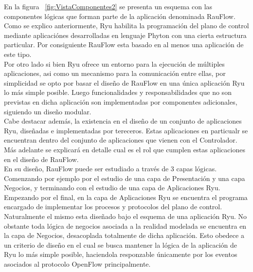 En la figura ~\ref{fig:VistaComponentes2} se presenta un esquema con las componentes l\'ogicas que forman parte de la aplicaci\'on denominada RauFlow. Como se explico anteriormente, Ryu habilita la programaci\'on del plano de control mediante aplicaci\'ones desarrolladas en lenguaje Phyton con una cierta estructura particular. Por consiguiente RauFlow esta basado en al menos una aplicaci\'on de este tipo.\\

Por otro lado si bien Ryu ofrece un entorno para la ejecuci\'on de m\'ultiples aplicaciones, asi como un mecanismo para la comunicaci\'on entre ellas, por simplicidad se opto por basar el dise\~no de RauFlow en una \'unica aplicaci\'on Ryu lo m\'as simple posible. Luego funcionalidades y responsabilidades que no son previstas en dicha aplicaci\'on son implementadas por componentes adicionales, siguiendo un dise\~no modular.\\

Cabe destacar adem\'as, la existencia en el dise\~no de un conjunto de aplicaciones Ryu, dise\~nadas e implementadas por tereceros. Estas aplicaciones en particualr se encuentran dentro del conjunto de aplicaciones que vienen con el Controlador. M\'as adelante se explicar\'a en detalle cual es el rol que cumplen estas aplicaciones en el dise\~no de RauFlow.\\

En su dise\~no, RauFlow puede ser estudiado a trav\'es de 3 capas l\'ogicas. Comenzando por ejemplo por el estudio de una capa de Presentaci\'on y una capa Negocios, y terminando con el estudio de una capa de Aplicaciones Ryu.\\ 


Empezando por el final, en la capa de Aplicaciones Ryu se encuentra el programa encargado de implementar los procesos y protocolos del plano de control. Naturalmente el mismo esta dise\~nado bajo el esquema de una aplicaci\'on Ryu. No obstante toda l\'ogica de negocios asociada a la realidad modelada se encuentra en la capa de Negocios, desacoplada totalmente de dicha aplicaci\'on. Esto obedece a un criterio de dise\~no en el cual se busca mantener la l\'ogica de la aplicaci\'on de Ryu lo m\'as simple posible, haciendola responzable \'unicamente por los eventos asociados al protocolo OpenFlow principalmente.\\ 

